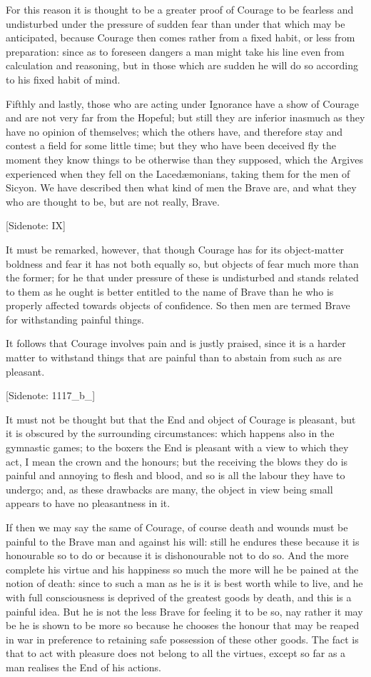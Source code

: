 For this reason it is thought to be a greater proof of Courage to be
fearless and undisturbed under the pressure of sudden fear than under
that which may be anticipated, because Courage then comes rather from a
fixed habit, or less from preparation: since as to foreseen dangers a
man might take his line even from calculation and reasoning, but in
those which are sudden he will do so according to his fixed habit of
mind.

Fifthly and lastly, those who are acting under Ignorance have a show
of Courage and are not very far from the Hopeful; but still they are
inferior inasmuch as they have no opinion of themselves; which the
others have, and therefore stay and contest a field for some little
time; but they who have been deceived fly the moment they know things to
be otherwise than they supposed, which the Argives experienced when they
fell on the Lacedæmonians, taking them for the men of Sicyon. We have
described then what kind of men the Brave are, and what they who are
thought to be, but are not really, Brave.

[Sidenote: IX]

It must be remarked, however, that though Courage has for its
object-matter boldness and fear it has not both equally so, but objects
of fear much more than the former; for he that under pressure of these
is undisturbed and stands related to them as he ought is better entitled
to the name of Brave than he who is properly affected towards objects
of confidence. So then men are termed Brave for withstanding painful
things.

It follows that Courage involves pain and is justly praised, since it
is a harder matter to withstand things that are painful than to abstain
from such as are pleasant.

[Sidenote: 1117_b_]

It must not be thought but that the End and object of Courage is
pleasant, but it is obscured by the surrounding circumstances: which
happens also in the gymnastic games; to the boxers the End is pleasant
with a view to which they act, I mean the crown and the honours; but the
receiving the blows they do is painful and annoying to flesh and blood,
and so is all the labour they have to undergo; and, as these drawbacks
are many, the object in view being small appears to have no pleasantness
in it.

If then we may say the same of Courage, of course death and wounds must
be painful to the Brave man and against his will: still he endures these
because it is honourable so to do or because it is dishonourable not to
do so. And the more complete his virtue and his happiness so much the
more will he be pained at the notion of death: since to such a man as
he is it is best worth while to live, and he with full consciousness is
deprived of the greatest goods by death, and this is a painful idea. But
he is not the less Brave for feeling it to be so, nay rather it may be
he is shown to be more so because he chooses the honour that may be
reaped in war in preference to retaining safe possession of these other
goods. The fact is that to act with pleasure does not belong to all the
virtues, except so far as a man realises the End of his actions.

